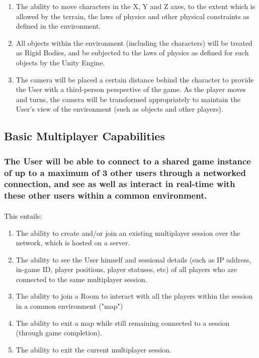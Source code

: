 \documentclass{article}
\begin{document}
\begin{enumerate}
  \item The ability to move characters in the X, Y and Z axes, to the extent which is allowed by the terrain, the laws of physics and other physical constraints as defined in the environment.
  \item All objects within the environment (including the characters) will be treated as Rigid Bodies, and be subjected to the laws of physics as defined for such objects by the Unity Engine.
  \item The camera will be placed a certain distance behind the character to provide the User with a third-person perspective of the game. As the player moves and turns, the camera will be transformed appropriately to maintain the User's view of the environment (such as objects and other players).
\end{enumerate}

\subsection{Basic Multiplayer Capabilities}
\subsubsection{\textbf{The User will be able to connect to a shared game instance of up to a maximum of 3 other users through a networked connection, and see as well as interact in real-time with these other users within a common environment.}}
\paragraph{}This entails:

\begin{enumerate}
  \item The ability to create and/or join an existing multiplayer session over the network, which is hosted on a server.
  \item The ability to see the User himself and sessional details (such as IP address, in-game ID, player positions, player statuses, etc) of all players who are connected to the same multiplayer session.
  \item The ability to join a Room to interact with all the players within the session in a common environment ("map")
  \item The ability to exit a map while still remaining connected to a session (through game completion).
  \item The ability to exit the current multiplayer session.
\end{enumerate}
\end{document}
